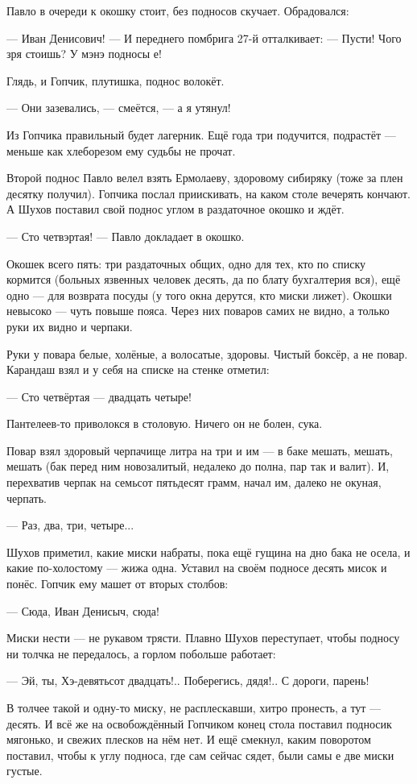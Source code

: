 Павло в очереди к окошку стоит, без подносов скучает. Обрадовался:

--- Иван Денисович! --- И переднего помбрига 27-й отталкивает: --- Пусти! Чого зря стоишь? У мэнэ
подносы е!

Глядь, и Гопчик, плутишка, поднос волокёт.

--- Они зазевались, --- смеётся, --- а я утянул!

Из Гопчика правильный будет лагерник. Ещё года три подучится, подрастёт --- меньше как
хлеборезом ему судьбы не прочат.

Второй поднос Павло велел взять Ермолаеву, здоровому сибиряку (тоже за плен десятку
получил). Гопчика послал приискивать, на каком столе вечерять кончают. А Шухов поставил свой
поднос углом в раздаточное окошко и ждёт.

--- Сто четвэртая! --- Павло докладает в окошко.

Окошек всего пять: три раздаточных общих, одно для тех, кто по списку кормится (больных
язвенных человек десять, да по блату бухгалтерия вся), ещё одно --- для возврата посуды (у того
окна дерутся, кто миски лижет). Окошки невысоко --- чуть повыше пояса. Через них поваров самих
не видно, а только руки их видно и черпаки.

Руки у повара белые, холёные, а волосатые, здоровы. Чистый боксёр, а не повар. Карандаш взял и
у себя на списке на стенке отметил:

--- Сто четвёртая --- двадцать четыре!

Пантелеев-то приволокся в столовую. Ничего он не болен, сука.

Повар взял здоровый черпачище литра на три и им --- в баке мешать, мешать, мешать (бак перед ним
новозалитый, недалеко до полна, пар так и валит). И, перехватив черпак на семьсот пятьдесят
грамм, начал им, далеко не окуная, черпать.

--- Раз, два, три, четыре...

Шухов приметил, какие миски набраты, пока ещё гущина на дно бака не осела, и какие
по-холостому --- жижа одна. Уставил на своём подносе десять мисок и понёс. Гопчик ему машет от
вторых столбов:

--- Сюда, Иван Денисыч, сюда!

Миски нести --- не рукавом трясти. Плавно Шухов переступает, чтобы подносу ни толчка не
передалось, а горлом побольше работает:

--- Эй, ты, Хэ-девятьсот двадцать!.. Поберегись, дядя!.. С дороги, парень!

В толчее такой и одну-то миску, не расплескавши, хитро пронесть, а тут --- десять. И всё же на
освобождённый Гопчиком конец стола поставил подносик мягонько, и свежих плесков на нём нет.
И ещё смекнул, каким поворотом поставил, чтобы к углу подноса, где сам сейчас сядет, были самы
е две миски густые.

